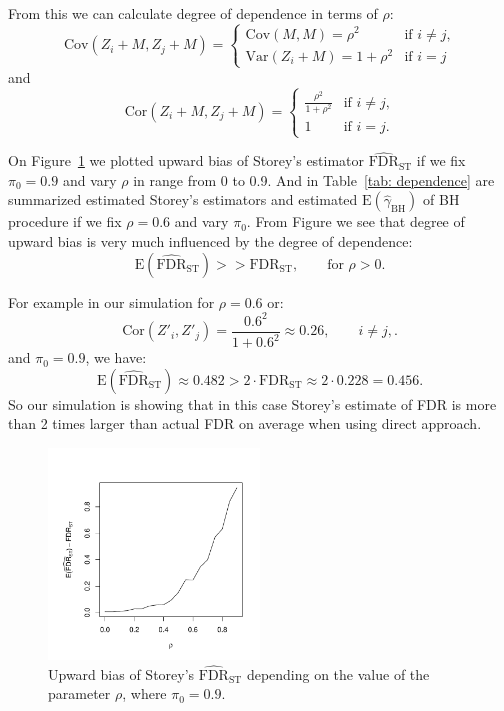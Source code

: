 \documentclass[10pt]{article}
\begin{document}
$\newcommand{\E}{\mathrm{E}}$
$\newcommand{\Var}{\mathrm{Var}}$
$\newcommand{\Cov}{\mathrm{Cov}}$

From this we can calculate degree of dependence in terms of $\rho$:
\[
\mathrm{Cov} (Z_{i} + M, Z_{j} + M) = \begin{cases}
	\mathrm{Cov}(M, M) = \rho^2 & \text{if $i \neq j$,}\\
	\mathrm{Var}(Z_{i} + M) = 1 + \rho^2 & \text{if $i = j$}
\end{cases}
\]
and 
\[
\mathrm{Cor} (Z_{i} + M, Z_{j} + M) = \begin{cases}
	\frac{\rho^2}{1 + \rho^2} & \text{if $i \neq j$,}\\
	1 & \text{if $i = j$.}
\end{cases}
\]

On Figure~\ref{fig: dependence} we plotted upward bias of Storey's estimator $\widehat{\text{FDR}}_{\text{ST}}$ if we fix $\pi_{0} = 0.9$ and vary $\rho$ in range from 0 to 0.9. And in Table~\ref{tab: dependence} are summarized estimated Storey's estimators and estimated $\text{E}(\widehat{\gamma}_{\text{BH}})$ of BH procedure if we fix $\rho = 0.6$ and vary $\pi_{0}$. From Figure we see that degree of upward bias is very much influenced by the degree of dependence:
\begin{equation}
\text{E}(\widehat{\text{FDR}}_{\text{ST}}) >> \text{FDR}_{\text{ST}}, \qquad \text{for  } \rho > 0.
\end{equation}

For example in our simulation for $\rho = 0.6$ or:
\begin{equation}
	\mathrm{Cor}(Z'_{i}, Z'_{j}) = \frac{0.6^2}{1 + 0.6^2} \approx 0.26, \qquad i \neq j,
.\end{equation}
and $\pi_{0} = 0.9$, we have:
\begin{equation}
	\text{E}(\widehat{\text{FDR}}_{\text{ST}}) \approx 0.482 > 2 \cdot \text{FDR}_{\text{ST}} \approx 2 \cdot 0.228 = 0.456.
\end{equation}
So our simulation is showing that in this case Storey's estimate of FDR is more than 2 times larger than actual FDR on average when using direct approach.


\begin{figure}[H]
	\centering
	\includegraphics[width=0.5\textwidth]{../data/FDR_of_ro.pdf}
	\caption{Upward bias of Storey's $\widehat{\text{FDR}}_{\text{ST}}$ depending on the value of the parameter $\rho$, where $\pi_{0} = 0.9$.}
	\label{fig: dependence}	
\end{figure}
\end{document}
